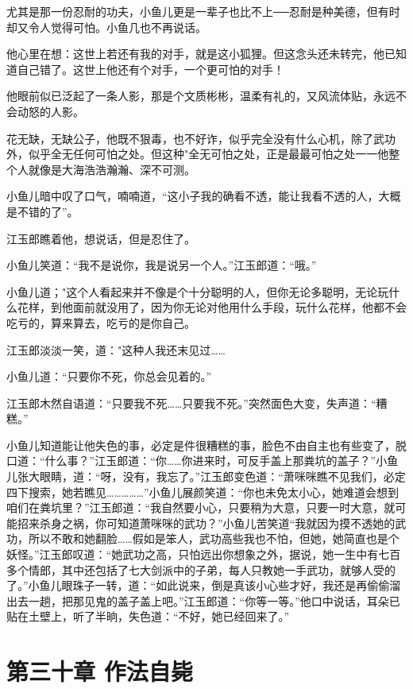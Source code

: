 \documentclass[12pt,oneside]{book}
\begin{document}
尤其是那一份忍耐的功夫，小鱼儿更是一辈子也比不上──忍耐是种美德，但有时却又令人觉得可怕。小鱼几也不再说话。

他心里在想：这世上若还有我的对手，就是这小狐狸。但这念头还未转完，他已知道自己错了。这世上他还有个对手，一个更可怕的对手！

他眼前似已泛起了一条人影，那是个文质彬彬，温柔有礼的，又风流体贴，永远不会动怒的人影。

花无缺，无缺公子，他既不狠毒，也不好诈，似乎完全没有什么心机，除了武功外，似乎全无任何可怕之处。但这种"全无可怕之处，正是最最可怕之处一一他整个人就像是大海浩浩瀚瀚、深不可测。

小鱼儿暗中叹了口气，喃喃道，``这小子我的确看不透，能让我看不透的人，大概是不错的了''。

江玉郎瞧着他，想说话，但是忍住了。

小鱼儿笑道：``我不是说你，我是说另一个人。''江玉郎道：``哦。''

小鱼儿道；"这个人看起来并不像是个十分聪明的人，但你无论多聪明，无论玩什么花样，到他面前就没用了，因为你无论对他用什么手段，玩什么花样，他都不会吃亏的，算来算去，吃亏的是你自己。

江玉郎淡淡一笑，道："这种人我还末见过\ldots\ldots{}

小鱼儿道：``只要你不死，你总会见着的。''

江玉郎木然自语道：``只要我不死\ldots\ldots 只要我不死。''突然面色大变，失声道：``糟糕。''

小鱼儿知道能让他失色的事，必定是件很糟糕的事，脸色不由自主也有些变了，脱口道：``什么事？''江玉郎道：``你\ldots\ldots 你进来时，可反手盖上那粪坑的盖子？''小鱼儿张大眼睛，道：``呀，没有，我忘了。''江玉郎变色道：``萧咪咪瞧不见我们，必定四下搜索，她若瞧见\ldots\ldots\ldots\ldots\ldots{}''小鱼儿展颜笑道：``你也未免太小心，她难道会想到咱们在粪坑里？''江玉郎道：``我自然要小心，只要稍为大意，只要一时大意，就可能招来杀身之祸，你可知道萧咪咪的武功？''小鱼儿苦笑道``我就因为摸不透她的武功，所以不敢和她翻脸\ldots\ldots 假如是笨人，武功高些我也不怕，但她，她简直也是个妖怪。''江玉郎叹道：``她武功之高，只怕远出你想象之外，据说，她一生中有七百多个情郎，其中还包括了七大剑派中的子弟，每人只教她一手武功，就够人受的了。''小鱼儿眼珠子一转，道：``如此说来，倒是真该小心些才好，我还是再偷偷溜出去一趟，把那见鬼的盖子盖上吧。''江玉郎道：``你等一等。''他口中说话，耳朵已贴在土壁上，听了半晌，失色道：``不好，她已经回来了。''

\hypertarget{ux7b2cux4e09ux5341ux7ae0-ux4f5cux6cd5ux81eaux6bd9}{%
\chapter{第三十章
作法自毙}\label{ux7b2cux4e09ux5341ux7ae0-ux4f5cux6cd5ux81eaux6bd9}}
\end{document}
